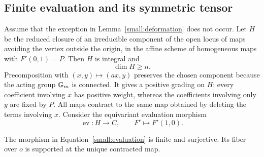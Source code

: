 \subsection{Finite evaluation and its symmetric tensor}

Assume that the exception in Lemma~\ref{small:deformation} does not
occur.  Let \(H\) be the reduced closure of an irreducible component
of the open locus of maps avoiding the vertex outside the origin,
in the affine scheme of homogeneous maps with \(F'(0,1)=P\).
Then \(H\) is integral and
\begin{equation}
 \dim H\geq n.
 \label{small:H-dimension}
\end{equation}
Precomposition with \((x,y)\mapsto(a x,y)\) preserves the chosen
component because the acting group \(\mathbb G_m\) is connected.  It gives a
positive grading on \(H\): every coefficient involving \(x\) has positive weight,
whereas the coefficients involving only \(y\) are fixed by \(P\).
All maps contract to the same map obtained by deleting the terms
involving \(x\).  Consider the equivariant evaluation morphism
\begin{equation}
 \operatorname{ev}:H\longrightarrow C,
 \qquad F'\longmapsto F'(1,0).
 \label{small:evaluation}
\end{equation}

\begin{lemma}
\label{small:finite-evaluation}
The morphism in Equation~\eqref{small:evaluation} is finite and
surjective.  Its fiber over \(o\) is supported at the unique contracted
map.
\end{lemma}

